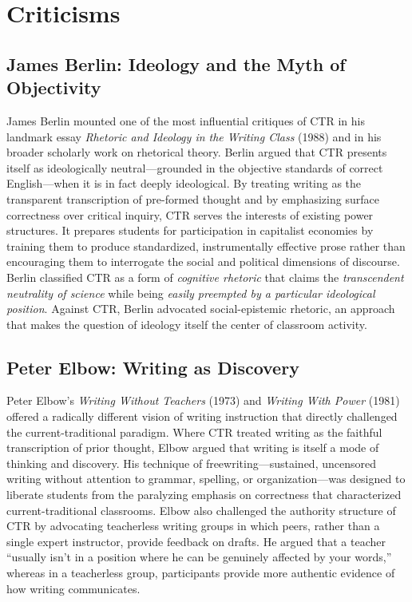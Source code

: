 \documentclass[12pt]{article}
\begin{document}
\section{Criticisms}

\subsection{James Berlin: Ideology and the Myth of Objectivity}

James Berlin mounted one of the most influential critiques of CTR in his landmark essay \textit{Rhetoric and Ideology in the Writing Class} (1988) and in his broader scholarly work on rhetorical theory. Berlin argued that CTR presents itself as ideologically neutral---grounded in the objective standards of correct English---when it is in fact deeply ideological. By treating writing as the transparent transcription of pre-formed thought and by emphasizing surface correctness over critical inquiry, CTR serves the interests of existing power structures. It prepares students for participation in capitalist economies by training them to produce standardized, instrumentally effective prose rather than encouraging them to interrogate the social and political dimensions of discourse. Berlin classified CTR as a form of \textit{cognitive rhetoric} that claims the \textit{transcendent neutrality of science} while being \textit{easily preempted by a particular ideological position}. Against CTR, Berlin advocated social-epistemic rhetoric, an approach that makes the question of ideology itself the center of classroom activity.

\subsection{Peter Elbow: Writing as Discovery}

Peter Elbow's \textit{Writing Without Teachers} (1973) and \textit{Writing With Power} (1981) offered a radically different vision of writing instruction that directly challenged the current-traditional paradigm. Where CTR treated writing as the faithful transcription of prior thought, Elbow argued that writing is itself a mode of thinking and discovery. His technique of freewriting---sustained, uncensored writing without attention to grammar, spelling, or organization---was designed to liberate students from the paralyzing emphasis on correctness that characterized current-traditional classrooms. Elbow also challenged the authority structure of CTR by advocating teacherless writing groups in which peers, rather than a single expert instructor, provide feedback on drafts. He argued that a teacher ``usually isn't in a position where he can be genuinely affected by your words,'' whereas in a teacherless group, participants provide more authentic evidence of how writing communicates.
\end{document}
